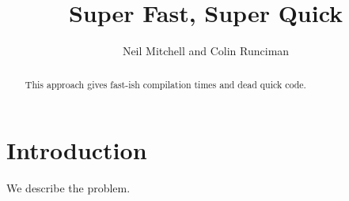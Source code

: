 \documentclass{llncs}
\begin{document}
\title{Super Fast, Super Quick}

\author{Neil Mitchell and Colin Runciman }


\maketitle              %

\begin{abstract}
This approach gives fast-ish compilation times and dead quick code.
\end{abstract}

\section{Introduction}

We describe the problem.
\end{document}
